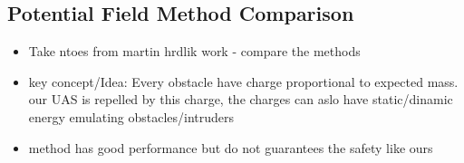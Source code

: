 \subsection{Potential Field Method Comparison}\label{s:potentialComparison}
\begin{itemize}
    \item Take ntoes from martin hrdlik work - compare the methods
    \item key concept/Idea: Every obstacle have charge proportional to expected mass. our UAS is repelled by this charge, the charges can aslo have static/dinamic energy emulating obstacles/intruders
    \item method has good performance but do not guarantees the safety like ours
\end{itemize}

